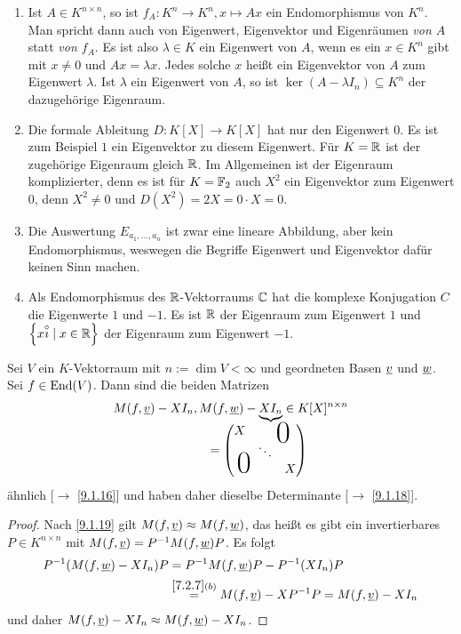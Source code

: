 \documentclass[../../main.tex]{subfiles}
\begin{document}
\begin{bsp}
\begin{enumerate}[\normalfont(a)]
\begin{center}
\end{center}
\item Ist $A\in K^{n\times n}$, so ist $f_A : K^n\to K^n, x\mapsto Ax$ ein Endomorphismus von $K^n$. Man spricht dann auch von Eigenwert, Eigenvektor und Eigenräumen \emph{von $A$} statt \emph{von $f_A$}. Es ist also $\lambda\in K$ ein Eigenwert von $A$, wenn es ein $x\in K^n$ gibt mit $x\ne 0$ und $Ax = \lambda x$.
Jedes solche $x$ heißt ein Eigenvektor von $A$ zum Eigenwert $\lambda$. Ist $\lambda$ ein Eigenwert von $A$, so ist $\ker(A-\lambda I_n)\subseteq K^n$ der dazugehörige Eigenraum.
\item Die formale Ableitung $D\colon K[X]\to K[X]$ hat nur den Eigenwert $0$. Es ist zum Beispiel $1$ ein Eigenvektor zu diesem Eigenwert. Für $K = \mathbb R$ ist der zugehörige Eigenraum gleich $\mathbb R$. Im Allgemeinen ist der Eigenraum komplizierter, denn es ist für $K = \mathbb F_2$ auch $X^2$ ein Eigenvektor zum Eigenwert $0$, denn $X^2 \ne 0$ und $D(X^2) = 2X = 0\cdot X = 0$.
\item Die Auswertung $E_{a_1,\ldots,a_n}$ ist zwar eine lineare Abbildung, aber kein Endomorphismus, weswegen die Begriffe Eigenwert und Eigenvektor dafür keinen Sinn machen.
\item Als Endomorphismus des $\mathbb R$-Vektorraums $\mathbb C$ hat die komplexe Konjugation $C$ die Eigenwerte $1$ und $-1$. Es ist $\mathbb R$ der Eigenraum zum Eigenwert $1$ und $\left\{x\overset\circ\imath\mid x\in\mathbb R\right\}$ der Eigenraum zum Eigenwert $-1$.
\end{enumerate}
\end{bsp}

\begin{lem}\label{10.1.4}
Sei $V$ ein $K$-Vektorraum mit $n:=\dim V<\infty$ und geordneten Basen ${\underline v}$ und ${\underline w}$. Sei $f\in \operatorname{End}(V)$. Dann sind die beiden Matrizen \[M(f,\v) - XI_n, M(f,\w)- \underbrace{XI_n}_{\llap{$=
\begin{pmatrix}
      X& \multicolumn{2}{c}{\text{\kern 1em\smash{\raisebox{-1.5ex}{\Huge$0$}}}} \\
      & \ddots &  \\
      \multicolumn{2}{c}{\text{\kern-1.5em\smash{\raisebox{0ex}{\Huge$0$}}}} &X
    \end{pmatrix}
$}}\in K[X]^{n\times n}\]
ähnlich {\rm[$\to$ \ref{9.1.16}]} und haben daher dieselbe Determinante {\rm[$\to$ \ref{9.1.18}]}.
\end{lem}
\begin{proof}
Nach \ref{9.1.19} gilt $M(f,{\underline v})\approx M(f,{\underline w})$, das heißt es gibt ein invertierbares $P\in K^{n\times n}$ mit $M(f,{\underline v}) = P^{-1}M(f,{\underline w})P$. Es folgt
\begin{align*}
P^{-1}(M(f,{\underline w})- XI_n)P &= P^{-1}M(f,{\underline w})P - P^{-1}(XI_n)P\\
&\overset{\ref{7.2.7}(b)}= M(f,{\underline v}) - XP^{-1}P = M(f,{\underline v}) - XI_n
\end{align*}
und daher $M(f,{\underline v}) - XI_n \approx M(f,{\underline w}) - X I_n$.
\end{proof}
\end{document}
